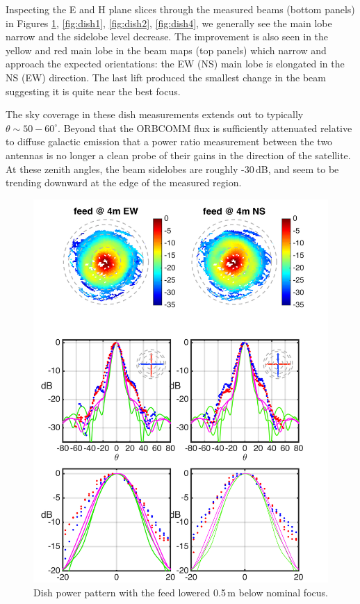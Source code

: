 \documentclass{emulateapj}
\begin{document}
Inspecting the E and H plane slices through the measured beams (bottom panels) in Figures \ref{fig:dish3}, \ref{fig:dish1}, \ref{fig:dish2}, \ref{fig:dish4}, we generally see the main lobe narrow and the sidelobe level decrease. The improvement is also seen in the yellow and red main lobe in the beam maps (top panels) which narrow and approach the expected orientations: the EW (NS) main lobe is elongated in the NS (EW) direction. The last lift produced the smallest change in the beam suggesting it is quite near the best focus. 

The sky coverage in these dish measurements extends out to typically $\theta\sim50-60^\circ$. Beyond that the ORBCOMM flux is sufficiently attenuated relative to diffuse galactic emission that a power ratio measurement between the two antennas is no longer a clean probe of their gains in the direction of the satellite. At these zenith angles, the beam sidelobes are roughly -30\,dB, and seem to be trending downward at the edge of the measured region.

\begin{figure}[h]
\includegraphics[width=6.5in]{dish3_abs_old_ref_model.png}
\caption{Dish power pattern with the feed lowered 0.5\,m below nominal focus.}
\label{fig:dish3}
\end{figure}
\end{document}
